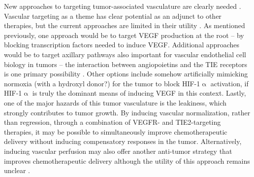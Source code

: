 New approaches to targeting tumor\hyp{}associated vasculature are clearly needed \citep{Cesca2013, Hara2016}. Vascular targeting as a theme has clear potential as an adjunct to other therapies, but the current approaches are limited in their utility \citep{Neri2005}. As mentioned previously, one approach would be to target VEGF production at the root -- by blocking transcription factors needed to induce VEGF. Additional approaches would be to target axillary pathways also important for vascular endothelial cell biology in tumors -- the interaction between angiopoietins and the TIE receptors is one primary possibility \citep{Hato2008, Fujita2017}. Other options include somehow artificially mimicking normoxia (with a hydroxyl donor?) for the tumor to block HIF\hyp{}1$\upalpha$ activation, if HIF\hyp{}1$\upalpha$ is truly the dominant means of inducing VEGF in this context. Lastly, one of the major hazards of this tumor vasculature is the leakiness, which strongly contributes to tumor growth. By inducing vascular normalization, rather than regression, through a combination of VEGFR\hyp{} and TIE2\hyp{}targeting therapies, it may be possible to simultaneously improve chemotherapeutic delivery without inducing compensatory responses in the tumor. Alternatively, inducing vascular perfusion may also offer another anti\hyp{}tumor strategy that improves chemotherapeutic delivery although the utility of this approach remains unclear \citep{Rivera2015}.

